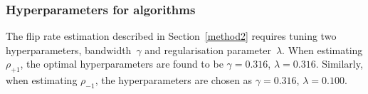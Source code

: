 \documentclass[12pt]{article} %
\newcommand{\rhoo}{\rho_{+1}}
\newcommand{\rhoz}{\rho_{-1}}
\newcommand{\mnist}{fashion-\textsc{mnist}}
\begin{document}
\subsubsection{Hyperparameters for algorithms}
The flip rate estimation described in Section~\ref{method2} requires tuning two hyperparameters, bandwidth~$\gamma$ and regularisation parameter~$\lambda$. When estimating $\rhoo$, the optimal hyperparameters are found to be $\gamma=0.316$, $\lambda=0.316$. Similarly, when estimating $\rhoz$, the hyperparameters are chosen as $\gamma=0.316$, $\lambda=0.100$.
\end{document}
